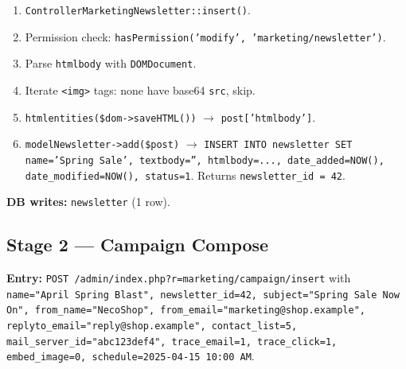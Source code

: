 \documentclass[11pt,a4paper]{article}
\begin{document}
\begin{enumerate}[leftmargin=1.6em,itemsep=2pt]
  \item \texttt{ControllerMarketingNewsletter::insert()}.
  \item Permission check: \texttt{hasPermission('modify',
        'marketing/newsletter')}.
  \item Parse \texttt{htmlbody} with \texttt{DOMDocument}.
  \item Iterate \texttt{<img>} tags: none have base64
        \texttt{src}, skip.
  \item \texttt{htmlentities(\$dom->saveHTML())} $\to$
        \texttt{post['htmlbody']}.
  \item \texttt{modelNewsletter->add(\$post)} $\to$
        \texttt{INSERT INTO newsletter SET name='Spring Sale',
        textbody='', htmlbody=..., date\_added=NOW(),
        date\_modified=NOW(), status=1}. Returns
        \texttt{newsletter\_id = 42}.
\end{enumerate}

\textbf{DB writes:} \texttt{newsletter} (1 row).

\subsection{Stage 2 --- Campaign Compose}

\textbf{Entry:} \texttt{POST /admin/index.php?r=marketing/campaign/insert}
with \texttt{name="April Spring Blast", newsletter\_id=42,
subject="Spring Sale Now On", from\_name="NecoShop",
from\_email="marketing@shop.example",
replyto\_email="reply@shop.example", contact\_list=5,
mail\_server\_id="abc123def4", trace\_email=1, trace\_click=1,
embed\_image=0, schedule=2025-04-15 10:00 AM}.
\end{document}
